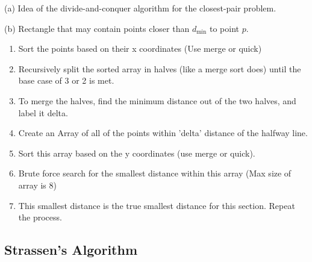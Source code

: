 
{\scriptsize
(a) Idea of the divide-and-conquer algorithm for the closest-pair problem.

(b) Rectangle that may contain points closer than $d_{\text{min}}$ to point $p$.
}

\begin{enumerate}
    \item Sort the points based on their x coordinates (Use merge or quick)
    \item Recursively split the sorted array in halves (like a merge sort does) until the base case of 3 or 2 is met.
    \item To merge the halves, find the minimum distance out of the two halves, and label it delta. 
    \item Create an Array of all of the points within 'delta' distance of the halfway line.
    \item Sort this array based on the y coordinates (use merge or quick).
    \item Brute force search for the smallest distance within this array (Max size of array is 8) 
    \item This smallest distance is the true smallest distance for this section. Repeat the process.
\end{enumerate}
\subsection*{Strassen's Algorithm}
\lipsum[1][1-2]
